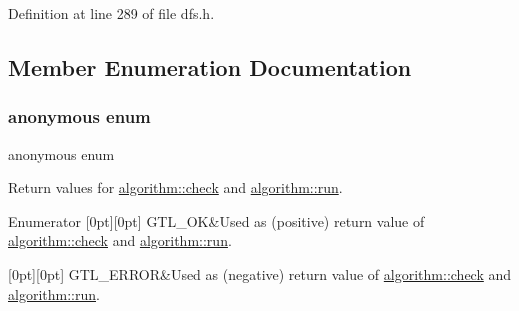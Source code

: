Definition at line 289 of file dfs.\+h.



\subsection{Member Enumeration Documentation}
\mbox{\label{classalgorithm_af1a0078e153aa99c24f9bdf0d97f6710}} 
\subsubsection{\texorpdfstring{anonymous enum}{anonymous enum}}
{\footnotesize\ttfamily anonymous enum\hspace{0.3cm}{\ttfamily [inherited]}}



Return values for \mbox{\hyperlink{classalgorithm_a76361fb03ad1cf643affc51821e43bed}{algorithm\+::check}} and \mbox{\hyperlink{classalgorithm_a734b189509a8d6b56b65f8ff772d43ca}{algorithm\+::run}}. 

\begin{DoxyEnumFields}{Enumerator}
[0pt][0pt]{}\mbox{\label{classalgorithm_af1a0078e153aa99c24f9bdf0d97f6710a5114c20e4a96a76b5de9f28bf15e282b}} 
G\+T\+L\+\_\+\+OK&Used as (positive) return value of \mbox{\hyperlink{classalgorithm_a76361fb03ad1cf643affc51821e43bed}{algorithm\+::check}} and \mbox{\hyperlink{classalgorithm_a734b189509a8d6b56b65f8ff772d43ca}{algorithm\+::run}}. \\
\hline

[0pt][0pt]{}\mbox{\label{classalgorithm_af1a0078e153aa99c24f9bdf0d97f6710a6fcf574690bbd6cf710837a169510dd7}} 
G\+T\+L\+\_\+\+E\+R\+R\+OR&Used as (negative) return value of \mbox{\hyperlink{classalgorithm_a76361fb03ad1cf643affc51821e43bed}{algorithm\+::check}} and \mbox{\hyperlink{classalgorithm_a734b189509a8d6b56b65f8ff772d43ca}{algorithm\+::run}}. \\
\hline

\end{DoxyEnumFields}


